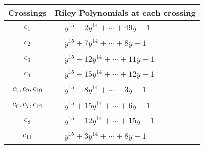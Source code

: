 \documentclass[1p]{elsarticle_modified}
\theoremstyle{definition}
\begin{document}
\begin{tabular}{m{50pt}|m{274pt}}
Crossings & \hspace{64pt}Riley Polynomials at each crossing \\
\hline $$\begin{aligned}c_{1}\end{aligned}$$&$\begin{aligned}
&y^{15}-2 y^{14}+\cdots+49 y-1
\end{aligned}$\\
\hline $$\begin{aligned}c_{2}\end{aligned}$$&$\begin{aligned}
&y^{15}+7 y^{14}+\cdots+8 y-1
\end{aligned}$\\
\hline $$\begin{aligned}c_{3}\end{aligned}$$&$\begin{aligned}
&y^{15}-12 y^{14}+\cdots+11 y-1
\end{aligned}$\\
\hline $$\begin{aligned}c_{4}\end{aligned}$$&$\begin{aligned}
&y^{15}-15 y^{14}+\cdots+12 y-1
\end{aligned}$\\
\hline $$\begin{aligned}c_{5},c_{9},c_{10}\end{aligned}$$&$\begin{aligned}
&y^{15}-8 y^{14}+\cdots-3 y-1
\end{aligned}$\\
\hline $$\begin{aligned}c_{6},c_{7},c_{12}\end{aligned}$$&$\begin{aligned}
&y^{15}+15 y^{14}+\cdots+6 y-1
\end{aligned}$\\
\hline $$\begin{aligned}c_{8}\end{aligned}$$&$\begin{aligned}
&y^{15}-12 y^{14}+\cdots+15 y-1
\end{aligned}$\\
\hline $$\begin{aligned}c_{11}\end{aligned}$$&$\begin{aligned}
&y^{15}+3 y^{14}+\cdots+8 y-1
\end{aligned}$\\
\hline
\end{tabular}\\~\\
\end{document}
